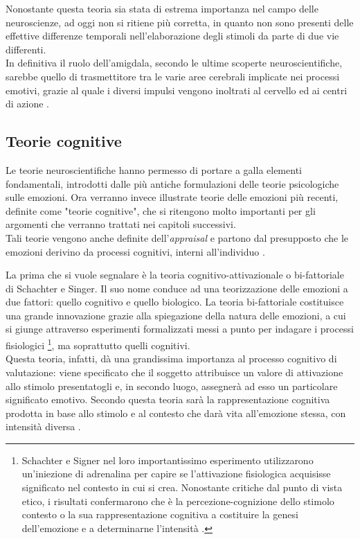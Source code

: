 Nonostante questa teoria sia stata di estrema importanza nel campo delle neuroscienze, ad oggi non si ritiene più corretta, in quanto non sono presenti delle effettive differenze temporali nell'elaborazione degli stimoli da parte di due vie differenti.\\
In definitiva il ruolo dell'amigdala, secondo le ultime scoperte neuroscientifiche, sarebbe quello di trasmettitore tra le varie aree cerebrali implicate nei processi emotivi, grazie al quale i diversi impulsi vengono inoltrati al cervello ed ai centri di azione \parencite{psicobiologia}.

\subsection{Teorie cognitive}
\label{subsec: Teorie cognitive}
Le teorie neuroscientifiche hanno permesso di portare a galla elementi fondamentali, introdotti dalle più antiche formulazioni delle teorie psicologiche sulle emozioni. Ora verranno invece illustrate teorie delle emozioni più recenti, definite come "teorie cognitive", che si ritengono molto importanti per gli argomenti che verranno trattati nei  capitoli successivi.\\
Tali teorie vengono anche definite dell’\textit{appraisal} e partono dal presupposto che le emozioni derivino da processi cognitivi, interni all’individuo \parencite{appraisal}.

La prima che si vuole segnalare è la teoria cognitivo-attivazionale o bi-fattoriale di Schachter e Singer. Il suo nome conduce ad una teorizzazione delle emozioni a due fattori: quello cognitivo e quello biologico.
La teoria bi-fattoriale costituisce una grande innovazione grazie alla spiegazione della natura delle emozioni, a cui si giunge attraverso esperimenti formalizzati messi a punto per indagare i processi fisiologici \footnote{Schachter e Signer nel loro importantissimo esperimento utilizzarono un'iniezione di adrenalina per capire se l'attivazione fisiologica acquisisse significato nel contesto in cui si crea. Nonostante critiche dal punto di vista etico, i risultati confermarono che è la percezione-cognizione dello stimolo contesto o la sua rappresentazione cognitiva a costituire la genesi dell’emozione e a determinarne l'intensità \parencite{schachter_singer}.}, ma soprattutto quelli cognitivi.\\
Questa teoria, infatti, dà una grandissima importanza al processo cognitivo di valutazione: viene specificato che il soggetto attribuisce un valore di attivazione allo stimolo presentatogli e, in secondo luogo, assegnerà ad esso un particolare significato emotivo.
Secondo questa teoria sarà la rappresentazione cognitiva prodotta in base allo stimolo e al contesto che darà vita all'emozione stessa, con intensità diversa \parencite{schachter_singer}.

